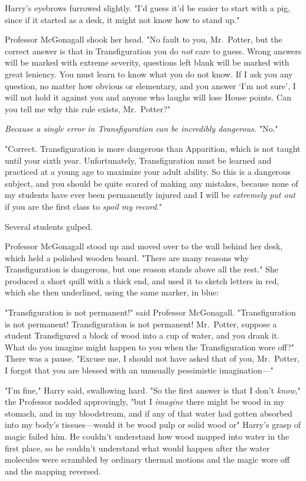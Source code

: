 Harry's eyebrows furrowed slightly. "I'd guess it'd be easier to start with a
pig, since if it started as a desk, it might not know how to stand up."

Professor McGonagall shook her head. "No fault to you, Mr.~Potter, but the
correct answer is that in Transfiguration you do \emph{not} care to guess.
Wrong answers will be marked with extreme severity, questions left blank will
be marked with great leniency. You must learn to know what you do not know. If
I ask you any question, no matter how obvious or elementary, and you answer
`I'm not sure', I will not hold it against you and anyone who laughs will lose
House points. Can you tell me why this rule exists, Mr.~Potter?"

\emph{Because a single error in Transfiguration can be incredibly dangerous.}
"No."

"Correct. Transfiguration is more dangerous than Apparition, which is not
taught until your sixth year. Unfortunately, Transfiguration must be learned
and practiced at a young age to maximize your adult ability. So this is a
dangerous subject, and you should be quite scared of making any mistakes,
because none of my students have ever been permanently injured and I will be
\emph{extremely put out} if you are the first class to \emph{spoil my record}."

Several students gulped.

Professor McGonagall stood up and moved over to the wall behind her desk, which
held a polished wooden board. "There are many reasons why Transfiguration is
dangerous, but one reason stands above all the rest." She produced a short
quill with a thick end, and used it to sketch letters in red, which she then
underlined, using the same marker, in blue:



"Transfiguration is not permanent!" said Professor McGonagall. "Transfiguration
is not permanent! Transfiguration is not permanent! Mr.~Potter, suppose a
student Transfigured a block of wood into a cup of water, and you drank it.
What do you imagine might happen to you when the Transfiguration wore off?"
There was a pause. "Excuse me, I should not have asked that of you, Mr.~Potter,
I forgot that you are blessed with an unusually pessimistic imagination\mbox{---}"

"I'm fine," Harry said, swallowing hard. "So the first answer is that I don't
\emph{know}," the Professor nodded approvingly, "but I \emph{imagine} there
might be{\el} wood in my stomach, and in my bloodstream, and if any of that
water had gotten absorbed into my body's tissues---would it be wood pulp or
solid wood or{\el}" Harry's grasp of magic failed him. He couldn't
understand how wood mapped into water in the first place, so he couldn't
understand what would happen after the water molecules were scrambled by
ordinary thermal motions and the magic wore off and the mapping reversed.

